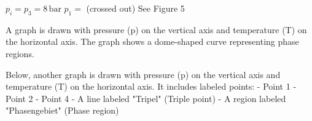 \( p_i = p_3 = 8 \, \text{bar} \)  
\( p_1 = \) (crossed out)  
See Figure 5  

A graph is drawn with pressure (p) on the vertical axis and temperature (T) on the horizontal axis. The graph shows a dome-shaped curve representing phase regions.  

Below, another graph is drawn with pressure (p) on the vertical axis and temperature (T) on the horizontal axis. It includes labeled points:  
- Point 1  
- Point 2  
- Point 4  
- A line labeled "Tripel" (Triple point)  
- A region labeled "Phasengebiet" (Phase region)